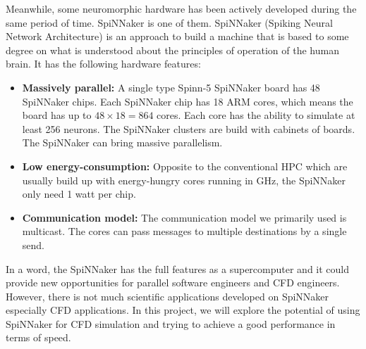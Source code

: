 Meanwhile, some neuromorphic hardware has been actively developed during the same period of time. SpiNNaker is one of them. SpiNNaker (Spiking Neural Network Architecture) \cite{thespinnbible} is an approach to build a machine that is based to some degree on what is understood about the principles of operation of the human brain. It has the following hardware features:
\begin{itemize} 
\item \textbf{Massively parallel:} A single type Spinn-5 SpiNNaker board has 48 SpiNNaker chips. Each SpiNNaker chip has 18 ARM cores, which means the board has up to $48 \times 18 = 864$ cores. Each core has the ability to simulate at least 256 neurons. The SpiNNaker clusters are build with cabinets of boards. The SpiNNaker can bring massive parallelism.

\item \textbf{Low energy-consumption:} Opposite to the conventional HPC which are usually build up with energy-hungry cores running in GHz, the SpiNNaker only need 1 watt per chip.

\item \textbf{Communication model:} The communication model we primarily used is multicast. The cores can pass messages to multiple destinations by a single send.
\end{itemize}


In a word, the SpiNNaker has the full features as a supercomputer and it could provide new opportunities for parallel software engineers and CFD engineers. However, there is not much scientific applications developed on SpiNNaker especially CFD applications. In this project, we will explore the potential of using SpiNNaker for CFD simulation and trying to achieve a good performance in terms of speed.\\
 

